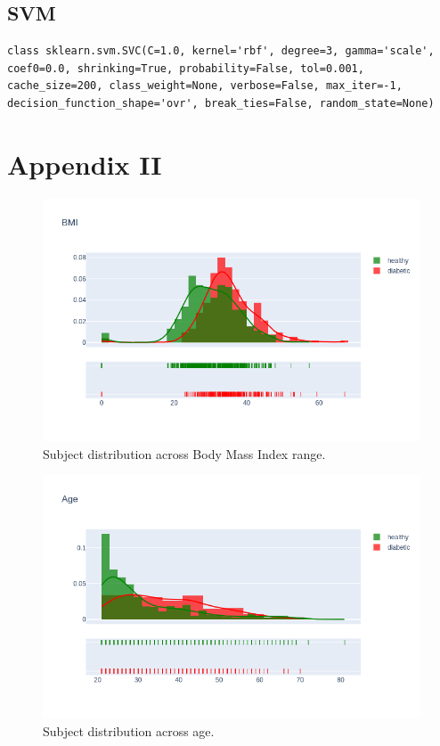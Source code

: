 \documentclass[12pt]{article}
\begin{document}
\subsection{SVM}
\begin{lstlisting}
class sklearn.svm.SVC(C=1.0, kernel='rbf', degree=3, gamma='scale', coef0=0.0, shrinking=True, probability=False, tol=0.001, cache_size=200, class_weight=None, verbose=False, max_iter=-1, decision_function_shape='ovr', break_ties=False, random_state=None)
\end{lstlisting}
\clearpage

\section{Appendix II}

\begin{figure}[ht]
\centering
\includegraphics[width=1\textwidth]{10.png}
\caption{\label{fig:1} Subject distribution across Body Mass Index range.}
\end{figure}

\begin{figure}[ht]
\centering
\includegraphics[width=1\textwidth]{11.png}
\caption{\label{fig:2} Subject distribution across age.}
\end{figure}
\end{document}
